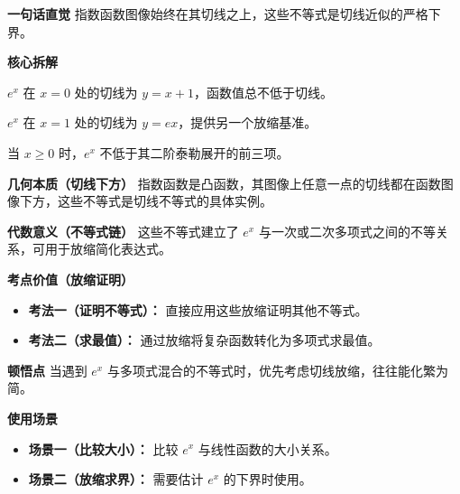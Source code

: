 \begin{explanationbox}
\textbf{\textcolor{CExplanation}{一句话直觉}}
指数函数图像始终在其切线之上，这些不等式是切线近似的严格下界。

\medskip
\textbf{\textcolor{CExplanation}{核心拆解}}
\begin{description}[style=nextline, leftmargin=2.8em, labelsep=0.5em, itemsep=0.45em]
    \item[\textbf{要点一（切线位置）：}] $e^x$ 在 $x=0$ 处的切线为 $y=x+1$，函数值总不低于切线。
    \item[\textbf{要点二（缩放系数）：}] $e^x$ 在 $x=1$ 处的切线为 $y=ex$，提供另一个放缩基准。
    \item[\textbf{要点三（二阶近似）：}] 当 $x\ge 0$ 时，$e^x$ 不低于其二阶泰勒展开的前三项。
\end{description}

\medskip
\textbf{\textcolor{CExplanation}{几何本质（切线下方）}}
指数函数是凸函数，其图像上任意一点的切线都在函数图像下方，这些不等式是切线不等式的具体实例。

\medskip
\textbf{\textcolor{CExplanation}{代数意义（不等式链）}}
这些不等式建立了 $e^x$ 与一次或二次多项式之间的不等关系，可用于放缩简化表达式。

\medskip
\textbf{\textcolor{CExplanation}{考点价值（放缩证明）}}
\begin{itemize}[leftmargin=*, itemsep=0.5em, topsep=0.4em]
    \item \textbf{考法一（证明不等式）：} 直接应用这些放缩证明其他不等式。
    \item \textbf{考法二（求最值）：} 通过放缩将复杂函数转化为多项式求最值。
\end{itemize}

\medskip
\textbf{\textcolor{CExplanation}{顿悟点}}
当遇到 $e^x$ 与多项式混合的不等式时，优先考虑切线放缩，往往能化繁为简。

\medskip
\textbf{\textcolor{CExplanation}{使用场景}}
\begin{itemize}[leftmargin=*, itemsep=0.5em, topsep=0.4em]
    \item \textbf{场景一（比较大小）：} 比较 $e^x$ 与线性函数的大小关系。
    \item \textbf{场景二（放缩求界）：} 需要估计 $e^x$ 的下界时使用。
\end{itemize}
\end{explanationbox}
